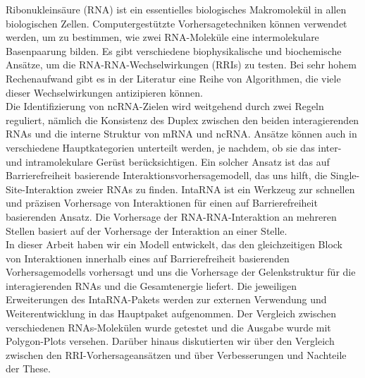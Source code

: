 \documentclass[twoside,a4paper]{report}
\begin{document}
Ribonukleinsäure (RNA) ist ein essentielles biologisches Makromolekül in allen biologischen Zellen. Computergestützte Vorhersagetechniken können verwendet werden, um zu bestimmen, wie zwei RNA-Moleküle eine intermolekulare Basenpaarung bilden. Es gibt verschiedene biophysikalische und biochemische Ansätze, um die RNA-RNA-Wechselwirkungen (RRIs) zu testen. Bei sehr hohem Rechenaufwand gibt es in der Literatur eine Reihe von Algorithmen, die viele dieser Wechselwirkungen antizipieren können. \\

Die Identifizierung von ncRNA-Zielen wird weitgehend durch zwei Regeln reguliert, nämlich die Konsistenz des Duplex zwischen den beiden interagierenden RNAs und die interne Struktur von mRNA und ncRNA. Ansätze können auch in verschiedene Hauptkategorien unterteilt werden, je nachdem, ob sie das inter- und intramolekulare Gerüst berücksichtigen. Ein solcher Ansatz ist das auf Barrierefreiheit basierende Interaktionsvorhersagemodell, das uns hilft, die Single-Site-Interaktion zweier RNAs zu finden. IntaRNA ist ein Werkzeug zur schnellen und präzisen Vorhersage von Interaktionen für einen auf Barrierefreiheit basierenden Ansatz. Die Vorhersage der RNA-RNA-Interaktion an mehreren Stellen basiert auf der Vorhersage der Interaktion an einer Stelle. \\

In dieser Arbeit haben wir ein Modell entwickelt, das den gleichzeitigen Block von Interaktionen innerhalb eines auf Barrierefreiheit basierenden Vorhersagemodells vorhersagt und uns die Vorhersage der Gelenkstruktur für die interagierenden RNAs und die Gesamtenergie liefert. Die jeweiligen Erweiterungen des IntaRNA-Pakets werden zur externen Verwendung und Weiterentwicklung in das Hauptpaket aufgenommen. Der Vergleich zwischen verschiedenen RNAs-Molekülen wurde getestet und die Ausgabe wurde mit Polygon-Plots versehen. Darüber hinaus diskutierten wir über den Vergleich zwischen den RRI-Vorhersageansätzen und über Verbesserungen und Nachteile der These.\\


	
	
	\tableofcontents
	 	
\end{document}
